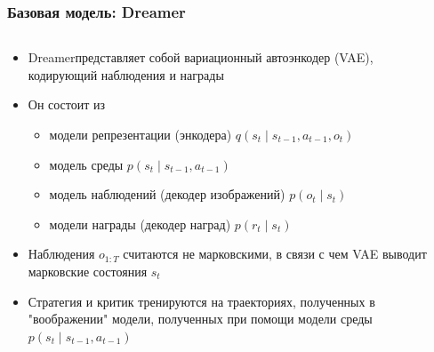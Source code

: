 \begin{frame}
\frametitle{Базовая модель: Dreamer}
\begin{columns}
\begin{column}{0.7\textwidth}
\begin{itemize}
    \item Dreamer\footnotemark[1] представляет собой вариационный автоэнкодер (VAE), кодирующий наблюдения и награды  
    \item Он состоит из
    \begin{itemize}
        \item модели репрезентации (энкодера) $q(s_t\mid s_{t-1}, a_{t-1}, o_{t})$
        \item модель среды $p(s_t \mid s_{t-1}, a_{t-1})$
        \item модель наблюдений (декодер изображений) $p(o_t\mid s_t)$
        \item модели награды (декодер наград) $p(r_t\mid s_t)$
    \end{itemize}
    \item Наблюдения $o_{1:T}$ считаются не марковскими, в связи с чем  VAE выводит марковские состояния $s_t$
    \item Стратегия и критик тренируются на траекториях, полученных в "воображении" модели, полученных при помощи модели среды $p(s_t\mid s_{t-1}, a_{t-1})$
\end{itemize}
\end{column}
\begin{column}{0.4\textwidth}


\end{column}
\end{columns}
\end{frame}
